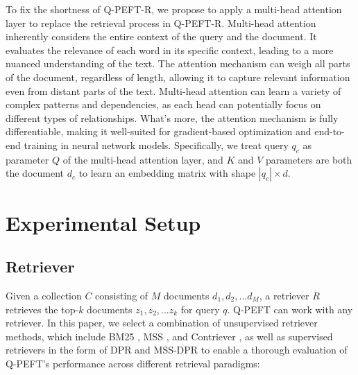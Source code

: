 \documentclass[sigconf,natbib=true,anonymous=false]{acmart}
\begin{document}
To fix the shortness of Q-PEFT-R, we propose to apply a multi-head attention layer to replace the retrieval process in Q-PEFT-R. Multi-head attention inherently considers the entire context of the query and the document. It evaluates the relevance of each word in its specific context, leading to a more nuanced understanding of the text. The attention mechanism can weigh all parts of the document, regardless of length, allowing it to capture relevant information even from distant parts of the text. Multi-head attention can learn a variety of complex patterns and dependencies, as each head can potentially focus on different types of relationships. What's more, the attention mechanism is fully differentiable, making it well-suited for gradient-based optimization and end-to-end training in neural network models. Specifically, we treat query $q_{c}$ as parameter $Q$ of the multi-head attention layer, and $K$ and $V$ parameters are both the document $d_{c}$ to learn an embedding matrix with shape $|q_{c}| \times d$. 

\section{Experimental Setup}

\subsection{Retriever} \label{sec: retriever}

Given a collection $C$ consisting of $M$ documents ${d_{1}, d_{2}, ... d_{M}}$, a retriever $R$ retrieves the top-$k$ documents ${z_{1}, z_{2}, ... z_{k}}$ for query $q$. Q-PEFT can work with any retriever. In this paper, we select a combination of unsupervised retriever methods, which include BM25 \cite{DBLP:journals/ftir/RobertsonZ09}, MSS \cite{DBLP:conf/acl/SachanPSKPHC20}, and Contriever \cite{DBLP:journals/tmlr/IzacardCHRBJG22}, as well as supervised retrievers in the form of DPR \cite{DBLP:conf/emnlp/KarpukhinOMLWEC20} and MSS-DPR \cite{DBLP:conf/acl/SachanPSKPHC20} to enable a thorough evaluation of Q-PEFT's performance across different retrieval paradigms:
\end{document}

